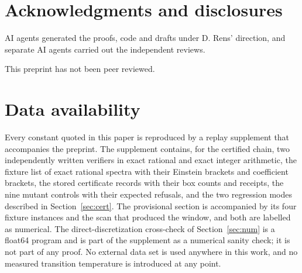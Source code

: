\documentclass[11pt]{article}
\theoremstyle{definition}
\theoremstyle{remark}
\begin{document}
\section*{Acknowledgments and disclosures}

AI agents generated the proofs, code and drafts under D. Rens' direction, and separate AI
agents carried out the independent reviews.

This preprint has not been peer reviewed.

\section*{Data availability}

Every constant quoted in this paper is reproduced by a replay supplement that accompanies
the preprint. The supplement contains, for the certified chain, two independently written
verifiers in exact rational and exact integer arithmetic, the fixture list of exact
rational spectra with their Einstein brackets and coefficient brackets, the stored
certificate records with their box counts and receipts, the nine mutant controls with
their expected refusals, and the two regression modes described in
Section~\ref{sec:cert}. The provisional section is accompanied by its four fixture
instances and the scan that produced the window, and both are labelled as numerical. The
direct-discretization cross-check of Section~\ref{sec:num} is a float64 program and is part
of the supplement as a numerical sanity check; it is not part of any proof. No external
data set is used anywhere in this work, and no measured transition temperature is
introduced at any point.



\end{document}

